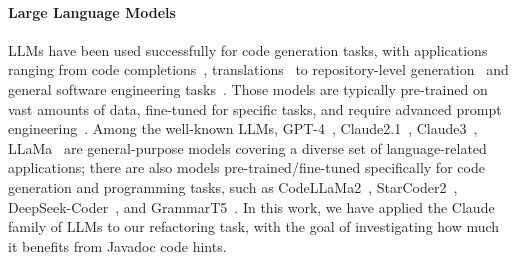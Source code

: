 \documentclass[sigconf]{acmart}
\begin{document}

%
%

\paragraph{Large Language Models}
%
LLMs have been used successfully for code generation tasks,
with applications ranging from code
completions~\cite{llmsforcodecompletion,ni2023lever,codegenclasslevel,Ding2024cocomic},
translations~\cite{tang-etal-2023-explain,lostintranslation} to
repository-level generation~\cite{zhang2023repocoder} and general software
engineering tasks~\cite{yang2024sweagent}.  Those models are typically
pre-trained on vast amounts of data, fine-tuned for specific tasks, and
require advanced prompt engineering~\cite{jiang2024survey}.
Among the well-known LLMs, GPT-4~\cite{openai2024gpt4}, Claude2.1~\cite{claude},
Claude3~\cite{claude}, LLaMa~\cite{touvron2023llama} are general-purpose
models covering a diverse set of language-related applications; there are
also models pre-trained/fine-tuned specifically for code generation and
programming tasks, such as CodeLLaMa2~\cite{roziere2024code},
StarCoder2~\cite{lozhkov2024starcoder},
DeepSeek-Coder~\cite{guo2024deepseekcoder}, and GrammarT5~\cite{grammart5}.
%
In this work, we have applied the Claude family of LLMs to our refactoring
task, with the goal of investigating how much it benefits from Javadoc code
hints.  %
\end{document}
